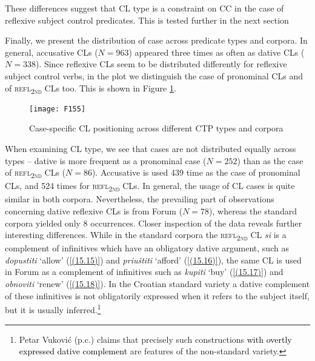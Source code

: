 \noindent These differences suggest that CL type is a constraint on CC in the case of reflexive subject control predicates. This is tested further in the next section

Finally, we present the distribution of case across predicate types and corpora. In general, accusative CLs ($N=963$) appeared three times as often as dative CLs ($N=338$). Since reflexive CLs seem to be distributed differently for reflexive subject control verbs, in the plot we distinguish the case of pronominal CLs and of \textsc{refl\textsubscript{2nd}} CLs too. This is shown in Figure \ref{F15.5}.

\begin{figure}
\caption{Case-specific CL positioning across different CTP types and corpora}
\label{F15.5}
\texttt{[image: F155]}
\end{figure}

When examining CL type, we see that cases are not distributed equally across types – dative is more frequent as a pronominal case ($N=252$) than as the case of \textsc{refl\textsubscript{2nd}} CLs ($N=86$). Accusative is used 439 time as the case of pronominal CLs, and 524 times for \textsc{refl\textsubscript{2nd}} CLs. In general, the usage of CL cases is quite similar in both corpora. Nevertheless, the prevailing part of observations concerning dative reflexive CLs is from Forum ($N=78$), whereas the standard corpora yielded only 8 occurrences. Closer inspection of the data reveals further interesting differences. While in the standard corpora the \textsc{refl\textsubscript{2nd}} CL \textit{si} is a complement of infinitives which have an obligatory dative argument, such as \textit{dopustiti} ‘allow’ (\ref{(15.15)}) and \textit{priuštiti} ‘afford’ (\ref{(15.16)}), the same CL is used in Forum as a complement of infinitives such as \textit{kupiti} ‘buy’ (\ref{(15.17)}) and \textit{obnoviti} ‘renew’ (\ref{(15.18)}). In the Croatian standard variety a dative complement of these infinitives is not obligatorily expressed when it refers to the subject itself, but it is usually inferred.\footnote{Petar Vuković (p.c.) claims that precisely such constructions \textcolor{black}{with overtly expressed dative complement} are features of the non-standard variety.}


